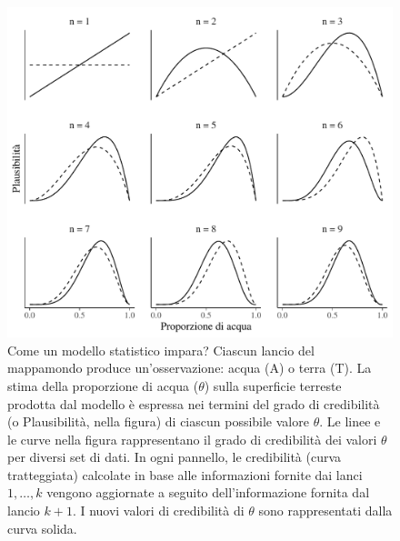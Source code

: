 \documentclass[
]{memoir}
\theoremstyle{definition}
\theoremstyle{definition}
\theoremstyle{definition}
\theoremstyle{definition}
\theoremstyle{remark}
\begin{document}
\begin{figure}

{\centering \includegraphics[width=1\linewidth]{images/rethinking_fig_2_5} 

}

\caption{Come un modello statistico impara? Ciascun lancio del mappamondo produce un'osservazione: acqua (A) o terra (T). La stima della proporzione di acqua ($\theta$) sulla superficie terreste prodotta dal modello è espressa nei termini del grado di credibilità (o Plausibilità, nella figura) di ciascun possibile valore $\theta$. Le linee e le curve nella figura rappresentano il grado di credibilità dei valori $\theta$ per diversi set di dati. In ogni pannello, le credibilità (curva tratteggiata) calcolate in base alle informazioni fornite dai lanci $1, \dots, k$ vengono aggiornate a seguito dell'informazione fornita dal lancio $k + 1$. I nuovi valori di credibilità di $\theta$ sono rappresentati dalla curva solida.}\label{fig:rethinkingmodlearn}
\end{figure}
\end{document}
